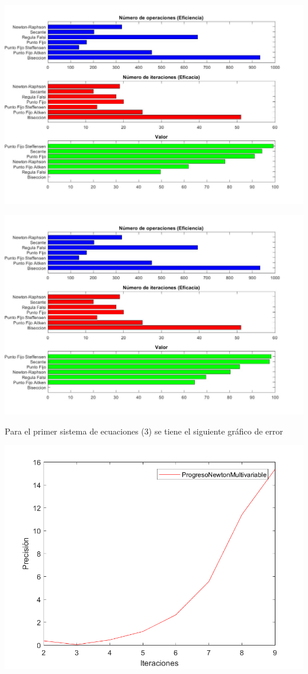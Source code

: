 \documentclass{memoria}
\begin{document}
{\includegraphics[width=15cm]{imagenes/NL/ranking2-2.jpg}}

{\includegraphics[width=15cm]{imagenes/NL/ranking2-3.jpg}}


Para el primer sistema de ecuaciones (3) se tiene el siguiente gráfico de error
    
{\includegraphics[width=15cm]{imagenes/NL/NewtonMultivariable_performance.png}}
\end{document}
